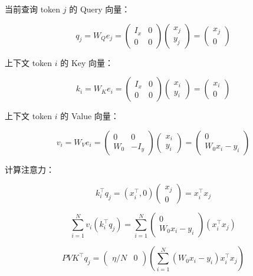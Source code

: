 当前查询 token \(j\) 的 Query 向量：

\[
q_j=W_Q e_j=\begin{pmatrix}I_x&0\\0&0\end{pmatrix}\begin{pmatrix}x_j\\y_j\end{pmatrix}=\begin{pmatrix}x_j\\0\end{pmatrix}
\]

上下文 token \(i\) 的 Key 向量：

\[
k_i=W_K e_i=\begin{pmatrix}I_x&0\\0&0\end{pmatrix}\begin{pmatrix}x_i\\y_i\end{pmatrix}=\begin{pmatrix}x_i\\0\end{pmatrix}
\]

上下文 token \(i\) 的 Value 向量：

\[
v_i=W_V e_i=\begin{pmatrix}0&0\\W_0&-I_y\end{pmatrix}\begin{pmatrix}x_i\\y_i\end{pmatrix}=\begin{pmatrix}0\\W_0x_i-y_i\end{pmatrix}
\]

计算注意力：

\[
k_i^\top q_j=(x_i^\top,0)\begin{pmatrix}x_j\\0\end{pmatrix}=x_i^\top x_j
\]

\[
\sum_{i=1}^{N}v_i(k_i^\top q_j)=\sum_{i=1}^{N}\begin{pmatrix}0\\W_0x_i-y_i\end{pmatrix}(x_i^\top x_j)
\]

\[
PVK^\top q_j=\begin{pmatrix}\eta/N&0\end{pmatrix}\left(\sum_{i=1}^{N}(W_0x_i-y_i)x_i^\top x_j\right)
\]

